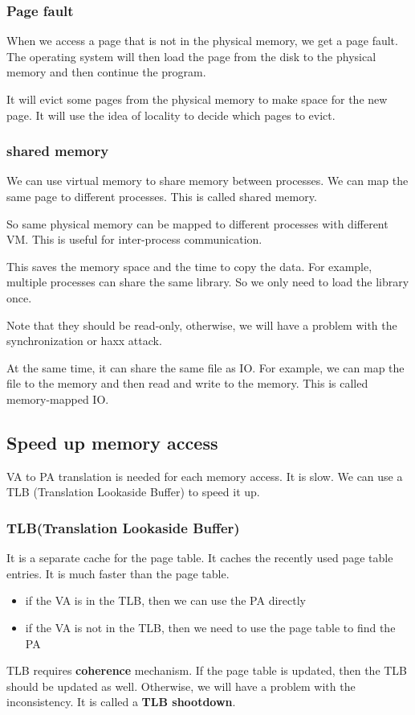 \documentclass[letterpaper,12pt]{article}
\begin{document}
\subsubsection{Page fault}
When we access a page that is not in the physical memory, we get a page fault.
The operating system will then load the page from the disk to the physical
memory and then continue the program.

It will evict some pages from the physical memory to make space for the new
page. It will use the idea of locality to decide which pages to evict.

\subsubsection{shared memory}
We can use virtual memory to share memory between processes. We can map the
same page to different processes. This is called shared memory.

So same physical memory can be mapped to different processes with different VM.
This is useful for inter-process communication.

This saves the memory space and the time to copy the data. For example,
multiple processes can share the same library. So we only need to load the
library once.

Note that they should be read-only, otherwise, we will have a problem with the
synchronization or haxx attack.

At the same time, it can share the same file as IO. For example, we can map the
file to the memory and then read and write to the memory. This is called
memory-mapped IO.

\subsection{Speed up memory access}
VA to PA translation is needed for each memory access. It is slow. We can use a
TLB (Translation Lookaside Buffer) to speed it up.
\subsubsection{TLB(Translation Lookaside Buffer)}
It is a separate cache for the page table. It caches the recently used page
table entries. It is much faster than the page table.

\begin{itemize}
    \item if the VA is in the TLB, then we can use the PA directly
    \item if the VA is not in the TLB, then we need to use the page table to find the PA
\end{itemize}
TLB requires \textbf{coherence} mechanism. If the page table is updated, then the TLB should be updated as well. Otherwise, we will have a problem with the inconsistency. It is called a \textbf{TLB shootdown}.
\end{document}
